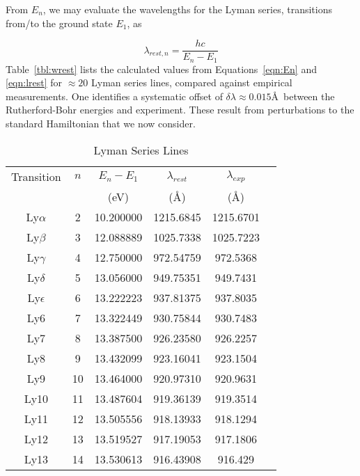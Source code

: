 \documentclass[graybox]{svmult}
\begin{document}
From $E_n$, we may evaluate the wavelengths for the Lyman
series, transitions from/to the ground state $E_1$, as

\begin{equation}
\lambda_{rest,n} = \frac{hc}{E_n - E_1}
\label{eqn:lrest}
\end{equation}
Table~\ref{tbl:wrest} lists the calculated values 
from Equations~\ref{eqn:En} and \ref{eqn:lrest}
for $\approx 20$ Lyman series lines, compared against
empirical measurements.  One identifies a systematic
offset of $\delta\lambda \approx 0.015$\AA\ between
the Rutherford-Bohr energies and experiment.
These result from perturbations to the 
standard Hamiltonian that we now consider.

\begin{table}[ht]
\begin{center}
\caption{Lyman Series Lines \label{tab:energies}}
\begin{tabular}{cccccc}
\hline
Transition & $n$ & $E_n - E_1$ & $\lambda_{rest}$ & $\lambda_{exp}$ \\
& & (eV) & (\AA) & (\AA) \\
\hline
Ly$\alpha$&           2&       10.200000&       1215.6845& 1215.6701 \\
Ly$\beta$&            3&       12.088889&       1025.7338& 1025.7223\\
Ly$\gamma$&           4&       12.750000&       972.54759&  972.5368\\
Ly$\delta$&           5&       13.056000&       949.75351&  949.7431\\
Ly$\epsilon$&         6&       13.222223&       937.81375&  937.8035\\
Ly6&                  7&       13.322449&       930.75844&  930.7483\\
Ly7&                  8&       13.387500&       926.23580&  926.2257\\
Ly8&                  9&       13.432099&       923.16041&  923.1504\\
Ly9&                  10&       13.464000&       920.97310& 920.9631\\
Ly10&                 11&       13.487604&       919.36139& 919.3514\\
Ly11&                 12&       13.505556&       918.13933& 918.1294\\
Ly12&                 13&       13.519527&       917.19053& 917.1806\\
Ly13&                 14&       13.530613&       916.43908& 916.429\\

\end{tabular}
\end{center}
\end{table}
\end{document}
